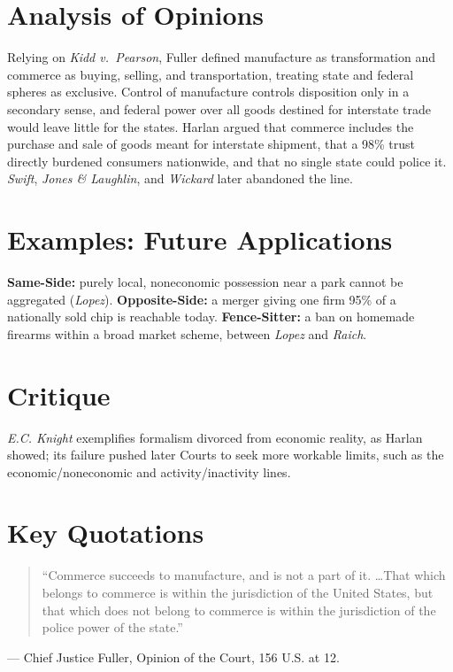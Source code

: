 \documentclass[12pt]{article}
\begin{document}
\section{Analysis of Opinions}
Relying on \textit{Kidd v.\ Pearson}, Fuller defined manufacture as transformation and commerce as buying, selling, and transportation, treating state and federal spheres as exclusive. Control of manufacture controls disposition only in a secondary sense, and federal power over all goods destined for interstate trade would leave little for the states. Harlan argued that commerce includes the purchase and sale of goods meant for interstate shipment, that a 98\% trust directly burdened consumers nationwide, and that no single state could police it. \textit{Swift}, \textit{Jones \& Laughlin}, and \textit{Wickard} later abandoned the line.

\section{Examples: Future Applications}
\textbf{Same-Side:} purely local, noneconomic possession near a park cannot be aggregated (\textit{Lopez}). \textbf{Opposite-Side:} a merger giving one firm 95\% of a nationally sold chip is reachable today. \textbf{Fence-Sitter:} a ban on homemade firearms within a broad market scheme, between \textit{Lopez} and \textit{Raich}.

\section{Critique}
\textit{E.C. Knight} exemplifies formalism divorced from economic reality, as Harlan showed; its failure pushed later Courts to seek more workable limits, such as the economic/noneconomic and activity/inactivity lines.

\section{Key Quotations}
\begin{quote}
``Commerce succeeds to manufacture, and is not a part of it. \ldots That which belongs to commerce is within the jurisdiction of the United States, but that which does not belong to commerce is within the jurisdiction of the police power of the state.''
\end{quote}
\noindent --- Chief Justice Fuller, Opinion of the Court, 156 U.S. at 12.
\end{document}
